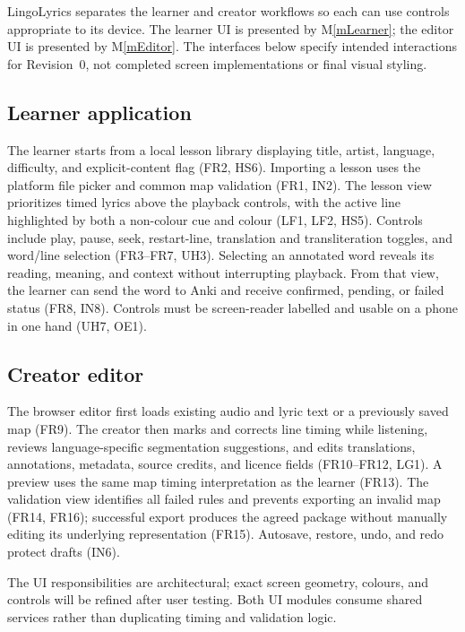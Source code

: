\documentclass[12pt, titlepage]{article}
\newcommand{\mref}[1]{M\ref{#1}}
\begin{document}
LingoLyrics separates the learner and creator workflows so each can use
controls appropriate to its device. The learner UI is presented by
\mref{mLearner}; the editor UI is presented by \mref{mEditor}. The interfaces
below specify intended interactions for Revision~0, not completed screen
implementations or final visual styling.

\subsection{Learner application}

The learner starts from a local lesson library displaying title, artist,
language, difficulty, and explicit-content flag (FR2, HS6). Importing a
lesson uses the platform file picker and common map validation (FR1, IN2).
The lesson view prioritizes timed lyrics above the playback controls,
with the active line highlighted by both a non-colour cue and colour
(LF1, LF2, HS5). Controls include play, pause, seek, restart-line,
translation and transliteration toggles, and word/line selection
(FR3--FR7, UH3). Selecting an annotated word reveals its reading,
meaning, and context without interrupting playback. From that view,
the learner can send the word to Anki and receive confirmed, pending,
or failed status (FR8, IN8). Controls must be screen-reader labelled
and usable on a phone in one hand (UH7, OE1).

\subsection{Creator editor}

The browser editor first loads existing audio and lyric text or a previously
saved map (FR9). The creator then marks and corrects line timing while
listening, reviews language-specific segmentation suggestions, and edits
translations, annotations, metadata, source credits, and licence fields
(FR10--FR12, LG1). A preview uses the same map timing interpretation as
the learner (FR13). The validation view identifies all failed rules and
prevents exporting an invalid map (FR14, FR16); successful export produces
the agreed package without manually editing its underlying representation
(FR15). Autosave, restore, undo, and redo protect drafts (IN6).

The UI responsibilities are architectural; exact screen geometry, colours,
and controls will be refined after user testing. Both UI modules consume
shared services rather than duplicating timing and validation logic.
\end{document}

